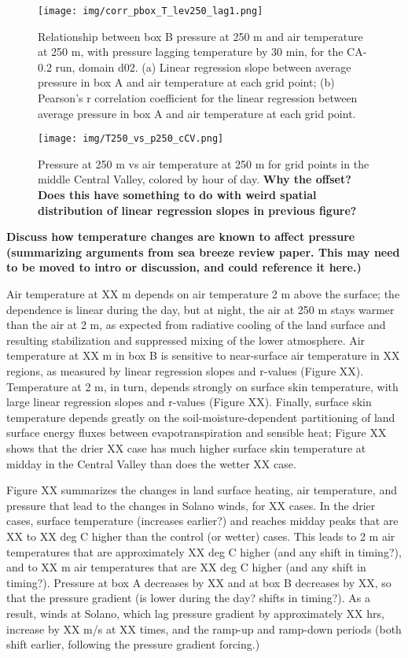 \begin{figure}[here]
\texttt{[image: img/corr\_pbox\_T\_lev250\_lag1.png]}
\caption{Relationship between box B pressure at 250 m and air temperature at 250 m, with pressure lagging temperature by 30 min, for the CA-0.2 run, domain d02.  (a) Linear regression slope between average pressure in box A and air temperature at each grid point; (b) Pearson's r correlation coefficient for the linear regression between average pressure in box A and air temperature at each grid point.}
\label{fig:windSol_corrTPmap}
\end{figure}

\begin{figure}[here]
\texttt{[image: img/T250\_vs\_p250\_cCV.png]}
\caption{Pressure at 250 m vs air temperature at 250 m for grid points in the middle Central Valley, colored by hour of day.  \textbf{Why the offset?  Does this have something to do with weird spatial distribution of linear regression slopes in previous figure?}}
\label{fig:windSol_scatterTP}
\end{figure}

\textbf{Discuss how temperature changes are known to affect pressure (summarizing arguments from sea breeze review paper.  This may need to be moved to intro or discussion, and could reference it here.)}

Air temperature at XX m depends on air temperature 2 m above the surface; the dependence is linear during the day, but at night, the air at 250 m stays warmer than the air at 2 m, as expected from radiative cooling of the land surface and resulting stabilization and suppressed mixing of the lower atmosphere.  Air temperature at XX m in box B is sensitive to near-surface air temperature in XX regions, as measured by linear regression slopes and r-values (Figure XX).  Temperature at 2 m, in turn, depends strongly on surface skin temperature, with large linear regression slopes and r-values (Figure XX).  Finally, surface skin temperature depends greatly on the soil-moisture-dependent partitioning of land surface energy fluxes between evapotranspiration and sensible heat; Figure XX shows that the drier XX case has much higher surface skin temperature at midday in the Central Valley than does the wetter XX case.

Figure XX summarizes the changes in land surface heating, air temperature, and pressure that lead to the changes in Solano winds, for XX cases.  In the drier cases, surface temperature (increases earlier?) and reaches midday peaks that are XX to XX deg C higher than the control (or wetter) cases.  This leads to 2 m air temperatures that are approximately XX deg C higher (and any shift in timing?), and to XX m air temperatures that are XX deg C higher (and any shift in timing?).  Pressure at box A decreases by XX and at box B decreases by XX, so that the pressure gradient (is lower during the day?  shifts in timing?).  As a result, winds at Solano, which lag pressure gradient by approximately XX hrs, increase by XX m/s at XX times, and the ramp-up and ramp-down periods (both shift earlier, following the pressure gradient forcing.)

